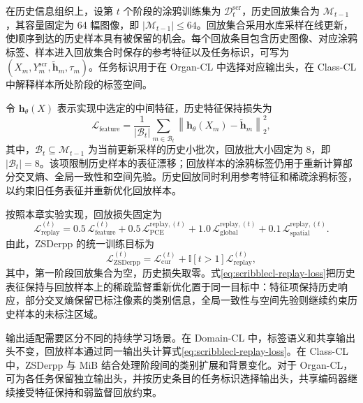 在历史信息组织上，设第 $t$ 个阶段的涂鸦训练集为 $\mathcal{D}^{\mathrm{scr}}_t$，历史回放集合为 $\mathcal{M}_{t-1}$，其容量固定为 64 幅图像，即 $|\mathcal{M}_{t-1}|\leq 64$。回放集合采用水库采样在线更新，使顺序到达的历史样本具有被保留的机会。每个回放条目包含历史图像、对应涂鸦标签、样本进入回放集合时保存的参考特征以及任务标识，可写为
$(X_m,Y_m^{\mathrm{scr}},\widetilde{\mathbf h}_m,\tau_m)$。任务标识用于在 Organ-CL 中选择对应输出头，在 Class-CL 中解释样本所处阶段的标签空间。

令 $\mathbf h_{\theta}(X)$ 表示实现中选定的中间特征，历史特征保持损失为
\begin{equation}
\mathcal{L}_{\mathrm{feature}}
=
\frac{1}{|\mathcal{B}_t|}
\sum_{m\in\mathcal{B}_t}
\left\|
\mathbf h_{\theta}(X_m)-\widetilde{\mathbf h}_m
\right\|_2^2,
\label{eq:scribblecl-feature-loss}
\end{equation}
其中，$\mathcal{B}_t\subseteq\mathcal{M}_{t-1}$ 为当前更新采样的历史小批次，回放批大小固定为 8，即 $|\mathcal{B}_t|=8$。该项限制历史样本的表征漂移；回放样本的涂鸦标签仍用于重新计算部分交叉熵、全局一致性和空间先验。历史回放同时利用参考特征和稀疏涂鸦标签，以约束旧任务表征并重新优化回放样本。

按照本章实验实现，回放损失固定为
\begin{equation}
\mathcal{L}_{\mathrm{replay}}^{(t)}
=
0.5\,\mathcal{L}_{\mathrm{feature}}^{(t)}
+
0.5\,\mathcal{L}_{\mathrm{PCE}}^{\mathrm{replay},(t)}
+
1.0\,\mathcal{L}_{\mathrm{global}}^{\mathrm{replay},(t)}
+
0.1\,\mathcal{L}_{\mathrm{spatial}}^{\mathrm{replay},(t)}.
\label{eq:scribblecl-replay-loss}
\end{equation}
由此，ZSDerpp 的统一训练目标为
\begin{equation}
\mathcal{L}_{\mathrm{ZSDerpp}}^{(t)}
=
\mathcal{L}_{\mathrm{cur}}^{(t)}
+
\mathbb{I}[t>1]\mathcal{L}_{\mathrm{replay}}^{(t)},
\label{eq:scribblecl-zsderpp-total}
\end{equation}
其中，第一阶段回放集合为空，历史损失取零。式\eqref{eq:scribblecl-replay-loss}把历史表征保持与回放样本上的稀疏监督重新优化置于同一目标中：特征项保持历史响应，部分交叉熵保留已标注像素的类别信息，全局一致性与空间先验则继续约束历史样本的未标注区域。

输出适配需要区分不同的持续学习场景。在 Domain-CL 中，标签语义和共享输出头不变，回放样本通过同一输出头计算式\eqref{eq:scribblecl-replay-loss}。在 Class-CL 中，ZSDerpp 与 MiB 结合处理阶段间的类别扩展和背景变化。对于 Organ-CL，可为各任务保留独立输出头，并按历史条目的任务标识选择输出头，共享编码器继续接受特征保持和弱监督回放约束。


